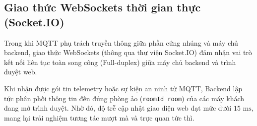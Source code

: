 \subsection{Giao thức WebSockets thời gian thực (Socket.IO)}
Trong khi MQTT phụ trách truyền thông giữa phần cứng nhúng và máy chủ backend, giao thức WebSockets (thông qua thư viện Socket.IO) đảm nhận vai trò kết nối liên tục toàn song công (Full-duplex) giữa máy chủ backend và trình duyệt web. 

Khi nhận được gói tin telemetry hoặc sự kiện an ninh từ MQTT, Backend lập tức phân phối thông tin đến đúng phòng ảo (\texttt{roomId room}) của các máy khách đang mở trình duyệt. Nhờ đó, độ trễ cập nhật giao diện web đạt mức dưới $15\text{ ms}$, mang lại trải nghiệm tương tác mượt mà và trực quan tức thì.

\newpage
